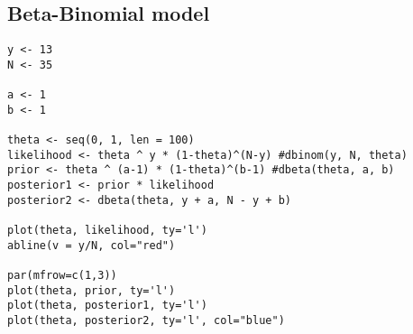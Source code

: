 \documentclass[11pt,a4paper]{article}
\begin{document}
\begin{CJK*}{UTF8}{gbsn}
\subsection{Beta-Binomial model}
\begin{lstlisting}
y <- 13
N <- 35

a <- 1
b <- 1

theta <- seq(0, 1, len = 100)
likelihood <- theta ^ y * (1-theta)^(N-y) #dbinom(y, N, theta)
prior <- theta ^ (a-1) * (1-theta)^(b-1) #dbeta(theta, a, b)
posterior1 <- prior * likelihood
posterior2 <- dbeta(theta, y + a, N - y + b)

plot(theta, likelihood, ty='l')
abline(v = y/N, col="red")

par(mfrow=c(1,3))
plot(theta, prior, ty='l')
plot(theta, posterior1, ty='l')
plot(theta, posterior2, ty='l', col="blue")

\end{lstlisting}


\end{CJK*}
\end{document}
